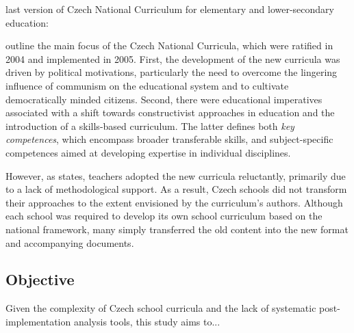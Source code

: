 \documentclass[]{interact}
\theoremstyle{plain}%
\theoremstyle{definition}
\theoremstyle{remark}
\begin{document}
last version of Czech National Curriculum for elementary and lower-secondary education: \cite{RVPZV2023}



\cite{Gracova2015Problems} outline the main focus of the Czech National Curricula, which were ratified in 2004 and implemented in 2005. First, the development of the new curricula was driven by political motivations, particularly the need to overcome the lingering influence of communism on the educational system and to cultivate democratically minded citizens. Second, there were educational imperatives associated with a shift towards constructivist approaches in education and the introduction of a skills-based curriculum. The latter defines both \textit{key competences}, which encompass broader transferable skills, and subject-specific competences aimed at developing expertise in individual disciplines.

However, as \cite{Jirecek2023Promeny} states, teachers adopted the new curricula reluctantly, primarily due to a lack of methodological support. As a result, Czech schools did not transform their approaches to the extent envisioned by the curriculum's authors. Although each school was required to develop its own school curriculum based on the national framework, many simply transferred the old content into the new format and accompanying documents.







\subsection{Objective}


Given the complexity of Czech school curricula and the lack of systematic post-implementation analysis tools, this study aims to...
\end{document}
